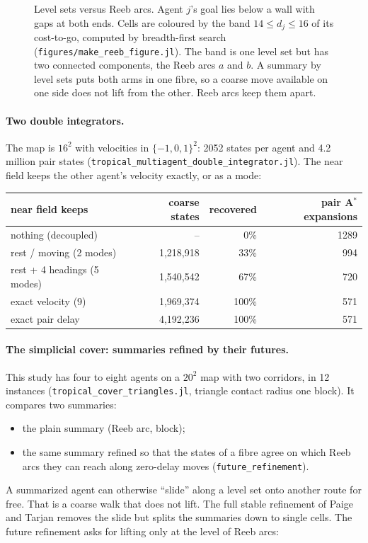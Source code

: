 \documentclass[11pt]{article}
\theoremstyle{definition}
\theoremstyle{remark}
\newcommand{\dd}{d}
\begin{document}
\begin{figure}[t]
\centering

\caption{Level sets versus Reeb arcs. Agent $j$'s goal lies below a wall with
gaps at both ends. Cells are coloured by the band $14 \le \dd_j \le 16$ of its
cost-to-go, computed by breadth-first search
(\texttt{figures/make\_reeb\_figure.jl}). The band is one level set but has two
connected components, the Reeb arcs $a$ and $b$. A summary by level sets puts both
arms in one fibre, so a coarse move available on one side does not lift from the
other. Reeb arcs keep them apart.}
\label{fig:reeb}
\end{figure}

\paragraph{Two double integrators.}
The map is $16^2$ with velocities in $\{-1,0,1\}^2$: 2052 states per agent and
4.2 million pair states
(\texttt{tropical\_multiagent\_double\_integrator.jl}). The near field keeps the
other agent's velocity exactly, or as a mode:

\begin{center}
\begin{tabular}{lrrr}
\toprule
near field keeps & coarse states & recovered & pair A$^*$ expansions \\
\midrule
nothing (decoupled) & -- & 0\% & 1289 \\
rest / moving (2 modes) & 1{,}218{,}918 & 33\% & 994 \\
rest + 4 headings (5 modes) & 1{,}540{,}542 & 67\% & 720 \\
exact velocity (9) & 1{,}969{,}374 & 100\% & 571 \\
exact pair delay & 4{,}192{,}236 & 100\% & 571 \\
\bottomrule
\end{tabular}
\end{center}

\paragraph{The simplicial cover: summaries refined by their futures.}
This study has four to eight agents on a $20^2$ map with two corridors, in 12
instances (\texttt{tropical\_cover\_triangles.jl}, triangle contact radius one
block). It compares two summaries:
\begin{itemize}[nosep]
\item the plain summary (Reeb arc, block);
\item the same summary refined so that the states of a fibre agree on which Reeb
  arcs they can reach along zero-delay moves (\texttt{future\_refinement}).
\end{itemize}
A summarized agent can otherwise ``slide'' along a level set onto another route
for free. That is a coarse walk that does not lift. The full stable refinement of
Paige and Tarjan removes the slide but splits the summaries down to single cells.
The future refinement asks for lifting only at the level of Reeb arcs:
\end{document}
